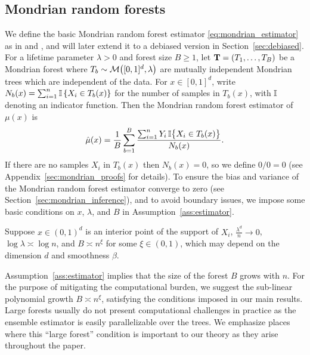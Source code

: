 \subsection{Mondrian random forests}

We define the basic Mondrian random forest estimator
\eqref{eq:mondrian_estimator}
as in \citet{lakshminarayanan2014mondrian} and
\citet{mourtada2020minimax},
and will later extend it to a debiased version
in Section~\ref{sec:debiased}.
For a lifetime parameter $\lambda > 0$ and
forest size $B \geq 1$,
let $\mathbf{T} = (T_1, \ldots, T_B)$ be a Mondrian forest
where $T_b \sim \mathcal{M}\big([0,1]^d, \lambda\big)$ are
mutually independent Mondrian trees which are
independent of the data.
For $x \in [0,1]^d$, write
$N_b(x) = \sum_{i=1}^{n} \mathbb{I} \left\{ X_i \in T_b(x) \right\}$
for the number of samples in $T_b(x)$,
with $\mathbb{I}$ denoting an indicator function.
Then the Mondrian random forest estimator of $\mu(x)$ is
%
\begin{align}
  \label{eq:mondrian_estimator}
  \hat\mu(x)
  =
  \frac{1}{B}
  \sum_{b=1}^B
  \frac{\sum_{i=1}^n Y_i \, \mathbb{I}\big\{ X_i \in T_b(x) \big\}}
  {N_b(x)}.
\end{align}
%
If there are no samples $X_i$ in $T_b(x)$ then $N_b(x) = 0$,
so we define $0/0 = 0$
(see Appendix~\ref{sec:mondrian_proofs} for details).
To ensure the bias and variance of the Mondrian random forest estimator
converge to zero (see Section~\ref{sec:mondrian_inference}),
and to avoid boundary issues,
we impose some basic conditions on
$x$, $\lambda$, and $B$ in Assumption~\ref{ass:estimator}.

\begin{assumption}%
  \label{ass:estimator}
  Suppose $x \in (0,1)^d$ is an interior point of the support of $X_i$,
  $\frac{\lambda^d}{n} \to 0$,
  $\log \lambda \asymp \log n$,
  and $B \asymp n^{\xi}$ for some $\xi \in (0, 1)$,
  which may depend on the dimension $d$ and smoothness $\beta$.
\end{assumption}

Assumption~\ref{ass:estimator} implies that
the size of the forest $B$ grows with $n$.
For the purpose of mitigating the computational burden,
we suggest the sub-linear polynomial growth $B \asymp n^{\xi}$,
satisfying the conditions imposed in our main results.
Large forests usually do not present computational challenges in
practice as the ensemble estimator is easily parallelizable over the trees.
We emphasize places where this ``large forest'' condition is important
to our theory as they arise throughout the paper.

